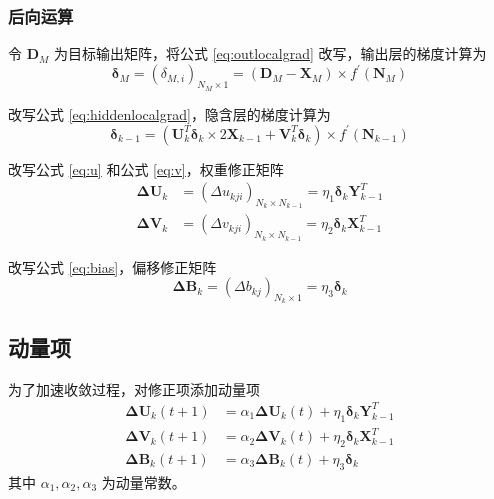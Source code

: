     \subsubsection{后向运算}

    令 $\mathbf{D}_M$ 为目标输出矩阵，将公式 \eqref{eq:outlocalgrad} 改写，输出层的梯度计算为
    \begin{equation}
        \boldsymbol{\delta}_{M} = (\delta_{M,i})_{N_M\times 1} = (\mathbf{D}_M - \mathbf{X}_M)\times f^\prime(\mathbf{N}_M)
    \end{equation}

    改写公式 \eqref{eq:hiddenlocalgrad}，隐含层的梯度计算为
    \begin{equation}
        \boldsymbol{\delta}_{k-1} = \left(\mathbf{U}_{k}^T\boldsymbol{\delta}_{k}\times 2\mathbf{X}_{k-1}+\mathbf{V}_{k}^T\boldsymbol{\delta}_{k}\right)\times f^\prime(\mathbf{N}_{k-1})
    \end{equation}

    改写公式 \eqref{eq:u} 和公式 \eqref{eq:v}，权重修正矩阵
    \begin{align*}
        \mathbf{\Delta U}_{k} &= (\Delta u_{kji})_{N_{k}\times N_{k-1}} = \eta_1 \boldsymbol{\delta}_k\mathbf{Y}_{k-1}^T \\
        \mathbf{\Delta V}_{k} &= (\Delta v_{kji})_{N_{k}\times N_{k-1}} = \eta_2 \boldsymbol{\delta}_k\mathbf{X}_{k-1}^T 
    \end{align*}

    改写公式 \eqref{eq:bias}，偏移修正矩阵
    \begin{equation*}
        \mathbf{\Delta B}_{k} = (\Delta b_{kj})_{N_{k}\times 1} = \eta_3 \boldsymbol{\delta}_{k}
    \end{equation*}

    \subsection{动量项}

    为了加速收敛过程，对修正项添加动量项
    \begin{align}
        \mathbf{\Delta U}_{k}(t+1) &= \alpha_1\mathbf{\Delta U}_{k}(t) + \eta_1 \boldsymbol{\delta}_k\mathbf{Y}_{k-1}^T \\
        \mathbf{\Delta V}_{k}(t+1) &= \alpha_2\mathbf{\Delta V}_{k}(t) + \eta_2 \boldsymbol{\delta}_k\mathbf{X}_{k-1}^T \\
        \mathbf{\Delta B}_{k}(t+1) &= \alpha_3\mathbf{\Delta B}_{k}(t) + \eta_3 \boldsymbol{\delta}_{k}
    \end{align}
    其中 $\alpha_1,\alpha_2,\alpha_3$ 为动量常数。

